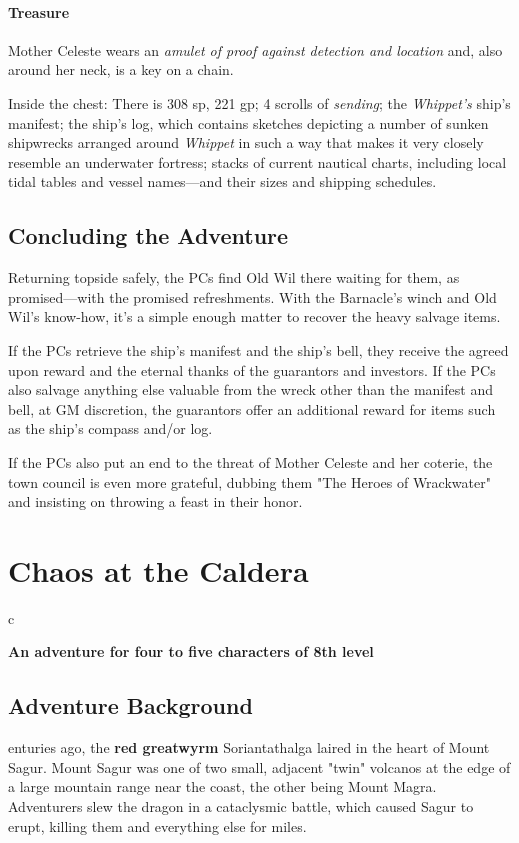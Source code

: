 \documentclass[10pt,a4paper,twoside,bg=print,twocolumn,openany,nodeprecatedcode]{dndbook}
\begin{document}
\subsubsection{Treasure}
Mother Celeste wears an \textit{amulet of proof against detection and location} and, also around her neck, is a key on a chain.

Inside the chest: There is 308 sp, 221 gp; 4 scrolls of \textit{sending}; the \textit{Whippet's} ship's manifest; the ship's log, which contains sketches depicting a number of sunken shipwrecks arranged around \textit{Whippet} in such a way that makes it very closely resemble an underwater fortress; stacks of current nautical charts, including local tidal tables and vessel names—and their sizes and shipping schedules.

\section{Concluding the Adventure}
Returning topside safely, the PCs find Old Wil there waiting for them, as promised—with the promised refreshments. With the Barnacle's winch and Old Wil's know-how, it's a simple enough matter to recover the heavy salvage items.

If the PCs retrieve the ship's manifest and the ship's bell, they receive the agreed upon reward and the eternal thanks of the guarantors and investors. If the PCs also salvage anything else valuable from the wreck other than the manifest and bell, at GM discretion, the guarantors offer an additional reward for items such as the ship's compass and/or log.

If the PCs also put an end to the threat of Mother Celeste and her coterie, the town council is even more grateful, dubbing them "The Heroes of Wrackwater" and insisting on throwing a feast in their honor.

\chapter{Chaos at the Caldera}

\begin{DndTable}{c}

\textbf{An adventure for four to five characters of 8th level}\\
\end{DndTable}

\section{Adventure Background}
enturies ago, the \textbf{red greatwyrm} Soriantathalga laired in the heart of Mount Sagur. Mount Sagur was one of two small, adjacent "twin" volcanos at the edge of a large mountain range near the coast, the other being Mount Magra. Adventurers slew the dragon in a cataclysmic battle, which caused Sagur to erupt, killing them and everything else for miles.
\end{document}
